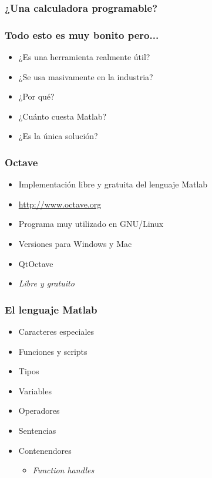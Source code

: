 \documentclass[12pt]{beamer}
\begin{document}
\begin{large}

\begin{frame}
  \frametitle{¿Una calculadora programable?}
  \testcode
\end{frame}

\begin{frame}
  \frametitle{Todo esto es muy bonito pero...}
  \begin{itemize}
    \item ¿Es una herramienta realmente útil?
    \item ¿Se usa masivamente en la industria?
    \item ¿Por qué?
    \item ¿Cuánto cuesta Matlab?
    \item ¿Es la única solución?
  \end{itemize}
\end{frame}

\begin{frame}
  \frametitle{Octave}
  \begin{itemize}
    \item Implementación libre y gratuita del lenguaje Matlab
    \item \url{http://www.octave.org}
    \item Programa muy utilizado en GNU/Linux
    \item Versiones para Windows y Mac
    \item QtOctave
    \item \emph{Libre y gratuito}
  \end{itemize}
\end{frame}

\begin{frame}
  \frametitle{El lenguaje Matlab}
  \begin{itemize}
    \item Caracteres especiales
    \item Funciones y scripts
    \item Tipos
    \item Variables
    \item Operadores
    \item Sentencias
    \item Contenendores
      \begin{itemize}
      \item \emph{Function handles}
      \end{itemize}
  \end{itemize}
\end{frame}


\end{large}
\end{document}
